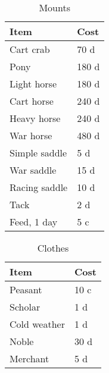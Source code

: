 \documentclass[a4paper,11pt,oneside]{book}
\begin{document}
\begin{table}[ht]
	\centering
	\caption{Mounts}
	\begin{tabular}{|l|l|}
		\hline
		Item & Cost\\ [0.5ex]
		\hline
		Cart crab & 70 d \\ 
		Pony & 180 d\\
		Light horse & 180 d\\
		Cart horse & 240 d\\
		Heavy horse & 240 d\\
		War horse & 480 d\\
		\hline
		Simple saddle & 5 d\\
		War saddle & 15 d\\
		Racing saddle & 10 d\\
		Tack & 2 d\\
		Feed, 1 day & 5 c\\
		\hline
	\end{tabular}
\end{table}

\begin{table}[ht]
	\centering
	\caption{Clothes}
	\begin{tabular}{|l|l|}
		\hline
		Item & Cost\\ [0.5ex]
		\hline
		Peasant & 10 c\\
		Scholar & 1 d\\
		Cold weather & 1 d\\
		Noble & 30 d\\
		Merchant & 5 d\\
		\hline
	\end{tabular}
\end{table}





\listoftables
\end{document}
